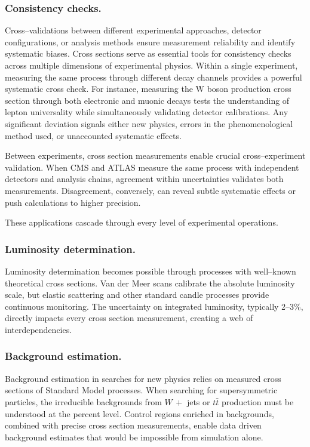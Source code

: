         \subsubsection{Consistency checks.}
            Cross--validations between different experimental approaches, detector configurations, or analysis methods ensure measurement reliability and identify systematic biases.
            Cross sections serve as essential tools for consistency checks across multiple dimensions of experimental physics.
            Within a single experiment, measuring the same process through different decay channels provides a powerful systematic cross check.
            For instance, measuring the W boson production cross section through both electronic and muonic decays tests the understanding of lepton universality while simultaneously validating detector calibrations.
            Any significant deviation signals either new physics, errors in the phenomenological method used, or unaccounted systematic effects.
            
            Between experiments, cross section measurements enable crucial cross--experiment validation.
            When CMS and ATLAS measure the same process with independent detectors and analysis chains, agreement within uncertainties validates both measurements.
            Disagreement, conversely, can reveal subtle systematic effects or push calculations to higher precision.

            These applications cascade through every level of experimental operations.
        \subsubsection{Luminosity determination.}
            Luminosity determination becomes possible through processes with well--known theoretical cross sections.
            Van der Meer scans calibrate the absolute luminosity scale, but elastic scattering and other standard candle processes provide continuous monitoring.
            The uncertainty on integrated luminosity, typically \numrange{2}{3}\%, directly impacts every cross section measurement, creating a web of interdependencies.
            
        \subsubsection{Background estimation.}
            Background estimation in searches for new physics relies on measured cross sections of Standard Model processes.
            When searching for supersymmetric particles, the irreducible backgrounds from \(W\, +\) jets or \(t\bar t\) production must be understood at the percent level.
            Control regions enriched in backgrounds, combined with precise cross section measurements, enable data driven background estimates that would be impossible from simulation alone.
